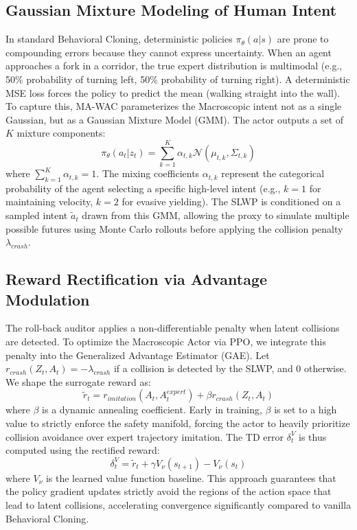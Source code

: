 \documentclass[conference]{IEEEtran}
\begin{document}
\subsection{Gaussian Mixture Modeling of Human Intent}
In standard Behavioral Cloning, deterministic policies $\pi_\theta(a|s)$ are prone to compounding errors because they cannot express uncertainty. When an agent approaches a fork in a corridor, the true expert distribution is multimodal (e.g., 50\% probability of turning left, 50\% probability of turning right). A deterministic MSE loss forces the policy to predict the mean (walking straight into the wall).
To capture this, MA-WAC parameterizes the Macroscopic intent not as a single Gaussian, but as a Gaussian Mixture Model (GMM). The actor outputs a set of $K$ mixture components:
\begin{equation}
\pi_\theta(a_t|z_t) = \sum_{k=1}^K \alpha_{t,k} \mathcal{N}(\mu_{t,k}, \Sigma_{t,k})
\end{equation}
where $\sum_{k=1}^K \alpha_{t,k} = 1$. The mixing coefficients $\alpha_{t,k}$ represent the categorical probability of the agent selecting a specific high-level intent (e.g., $k=1$ for maintaining velocity, $k=2$ for evasive yielding). The SLWP is conditioned on a sampled intent $\tilde{a}_t$ drawn from this GMM, allowing the proxy to simulate multiple possible futures using Monte Carlo rollouts before applying the collision penalty $\lambda_{crash}$.

\subsection{Reward Rectification via Advantage Modulation}
The roll-back auditor applies a non-differentiable penalty when latent collisions are detected. To optimize the Macroscopic Actor via PPO, we integrate this penalty into the Generalized Advantage Estimator (GAE). Let $r_{crash}(Z_t, A_t) = -\lambda_{crash}$ if a collision is detected by the SLWP, and $0$ otherwise. We shape the surrogate reward as:
\begin{equation}
\tilde{r}_t = r_{imitation}(A_t, A_t^{expert}) + \beta r_{crash}(Z_t, A_t)
\end{equation}
where $\beta$ is a dynamic annealing coefficient. Early in training, $\beta$ is set to a high value to strictly enforce the safety manifold, forcing the actor to heavily prioritize collision avoidance over expert trajectory imitation. The TD error $\delta_t^V$ is thus computed using the rectified reward:
\begin{equation}
\delta_t^V = \tilde{r}_t + \gamma V_\nu(s_{t+1}) - V_\nu(s_t)
\end{equation}
where $V_\nu$ is the learned value function baseline. This approach guarantees that the policy gradient updates strictly avoid the regions of the action space that lead to latent collisions, accelerating convergence significantly compared to vanilla Behavioral Cloning.
\end{document}
